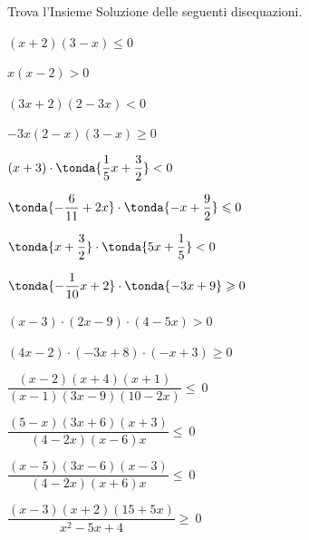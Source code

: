 \begin{esercizio}[*]
\label{ese:21.44}
Trova l'Insieme Soluzione delle seguenti disequazioni.
\begin{enumeratea}
\item \((x+2)(3-x)\leqslant 0\) 
\item \(x(x-2)>0\) 
\item \((3x+2)(2-3x)<0\) 
\item \(-3x(2-x)(3-x)\geqslant 0\) 
\item \((x+3)\cdot \tonda{\dfrac{1}{5}x+\dfrac{3}{2}}<0\) 
\item 
\(\tonda{-{\dfrac{6}{11}}+2x}\cdot\tonda{-x+\dfrac{9}{2}}\leqslant 
0\)
\item \(\tonda{x+\dfrac{3}{2}}\cdot \tonda{5x+\dfrac{1}{5}}<0\)
\item \(\tonda{-{\dfrac{1}{10}}x+2}\cdot \tonda{-3x+9}\geqslant 0\)
\item \((x-3)\cdot (2x-9)\cdot (4-5x)>0\)
\item \((4x-2)\cdot (-3x+8)\cdot (-x+3)\ge0\)
\item \(\dfrac{(x-2)(x+4)(x+1)}{(x-1)(3x-9)(10-2x)}\leqslant~0\) 
\item \(\dfrac{(5-x)(3x+6)(x+3)}{(4-2x)(x-6)x}\leqslant~0\)
\item \(\dfrac{(x-5)(3x-6)(x-3)}{(4-2x)(x+6)x}\leqslant~0\)
\item \(\dfrac{(x-3)(x+2)(15+5x)}{x^{2}-5x+4}\geqslant~0\)
\end{enumeratea}
\end{esercizio}

